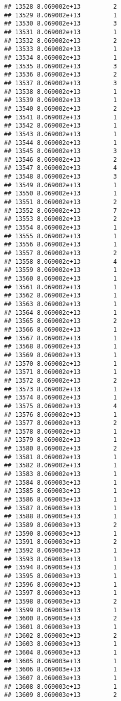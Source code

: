 \documentclass[
]{article}
\begin{document}
\begin{verbatim}
## 13528 8.069002e+13         2
## 13529 8.069002e+13         1
## 13530 8.069002e+13         3
## 13531 8.069002e+13         1
## 13532 8.069002e+13         2
## 13533 8.069002e+13         1
## 13534 8.069002e+13         1
## 13535 8.069002e+13         3
## 13536 8.069002e+13         2
## 13537 8.069002e+13         3
## 13538 8.069002e+13         1
## 13539 8.069002e+13         1
## 13540 8.069002e+13         2
## 13541 8.069002e+13         1
## 13542 8.069002e+13         1
## 13543 8.069002e+13         1
## 13544 8.069002e+13         1
## 13545 8.069002e+13         3
## 13546 8.069002e+13         2
## 13547 8.069002e+13         4
## 13548 8.069002e+13         3
## 13549 8.069002e+13         1
## 13550 8.069002e+13         1
## 13551 8.069002e+13         2
## 13552 8.069002e+13         7
## 13553 8.069002e+13         2
## 13554 8.069002e+13         1
## 13555 8.069002e+13         1
## 13556 8.069002e+13         1
## 13557 8.069002e+13         2
## 13558 8.069002e+13         4
## 13559 8.069002e+13         1
## 13560 8.069002e+13         1
## 13561 8.069002e+13         1
## 13562 8.069002e+13         1
## 13563 8.069002e+13         1
## 13564 8.069002e+13         1
## 13565 8.069002e+13         2
## 13566 8.069002e+13         1
## 13567 8.069002e+13         1
## 13568 8.069002e+13         1
## 13569 8.069002e+13         1
## 13570 8.069002e+13         1
## 13571 8.069002e+13         1
## 13572 8.069002e+13         2
## 13573 8.069002e+13         1
## 13574 8.069002e+13         1
## 13575 8.069002e+13         4
## 13576 8.069002e+13         1
## 13577 8.069002e+13         2
## 13578 8.069002e+13         1
## 13579 8.069002e+13         1
## 13580 8.069002e+13         2
## 13581 8.069002e+13         1
## 13582 8.069002e+13         1
## 13583 8.069002e+13         1
## 13584 8.069003e+13         1
## 13585 8.069003e+13         1
## 13586 8.069003e+13         1
## 13587 8.069003e+13         1
## 13588 8.069003e+13         1
## 13589 8.069003e+13         2
## 13590 8.069003e+13         1
## 13591 8.069003e+13         2
## 13592 8.069003e+13         1
## 13593 8.069003e+13         1
## 13594 8.069003e+13         1
## 13595 8.069003e+13         1
## 13596 8.069003e+13         1
## 13597 8.069003e+13         1
## 13598 8.069003e+13         2
## 13599 8.069003e+13         1
## 13600 8.069003e+13         2
## 13601 8.069003e+13         1
## 13602 8.069003e+13         2
## 13603 8.069003e+13         1
## 13604 8.069003e+13         1
## 13605 8.069003e+13         1
## 13606 8.069003e+13         1
## 13607 8.069003e+13         1
## 13608 8.069003e+13         1
## 13609 8.069003e+13         2

\end{verbatim}
\end{document}
